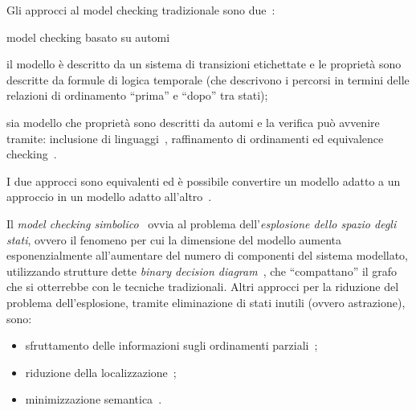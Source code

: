 		Gli approcci al model checking tradizionale sono due~\cite{clarke1996formal}:
		\begin{labeling}{model checking basato su automi}
			\item [model checking temporale] il modello \`e descritto da un sistema di transizioni etichettate e le propriet\`a sono descritte da formule di logica temporale (che descrivono i percorsi in termini delle relazioni di ordinamento ``prima'' e ``dopo'' tra stati);
			\item [model checking basato su automi] sia modello che propriet\`a sono descritti da automi e la verifica pu\`o avvenire tramite: inclusione di linguaggi~\cite{har1990software}, raffinamento di ordinamenti ed equivalence checking~\cite{cleaveland1993concurrency}.
		\end{labeling}
		
		I due approcci sono equivalenti ed \`e possibile convertire un modello adatto a un approccio in un modello adatto all'altro~\cite{vardi1986automata}.
		
		Il \emph{model checking simbolico}~\cite{mcmillan1993symbolic} ovvia al problema dell'\emph{esplosione dello spazio degli stati}, ovvero il fenomeno per cui la dimensione del modello aumenta esponenzialmente all'aumentare del numero di componenti del sistema modellato, utilizzando strutture dette \emph{binary decision diagram}~\cite{bryant1986graph}, che ``compattano'' il grafo che si otterrebbe con le tecniche tradizionali.
		Altri approcci per la riduzione del problema dell'esplosione, tramite eliminazione di stati inutili (ovvero astrazione), sono:
		\begin{itemize}
			\item sfruttamento delle informazioni sugli ordinamenti parziali~\cite{peled1994combining};
			\item riduzione della localizzazione~\cite{kurshan1994complexity};
			\item minimizzazione semantica~\cite{elseaidy1997modeling}.
		\end{itemize}


